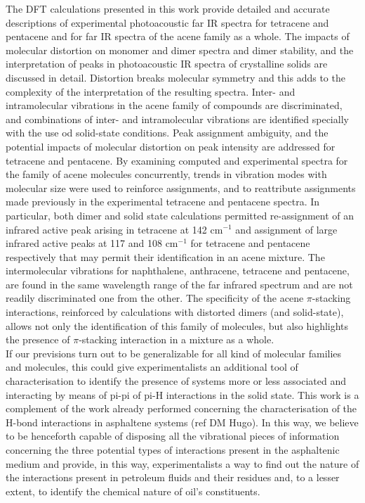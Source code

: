  The DFT calculations presented in this work provide detailed and accurate descriptions of experimental photoacoustic far IR spectra for tetracene and pentacene and for far IR spectra of the acene family as a whole.  The impacts of molecular distortion on monomer and dimer spectra and dimer stability, and the interpretation of peaks in photoacoustic IR spectra of crystalline solids are discussed in detail. Distortion breaks molecular symmetry and this adds to the complexity of the interpretation of the resulting spectra. Inter- and intramolecular vibrations in the acene family of compounds are discriminated, and combinations of inter- and intramolecular vibrations are identified specially with the use od solid-state conditions. Peak assignment ambiguity, and the potential impacts of molecular distortion on peak intensity are addressed for tetracene and pentacene. By examining computed and experimental spectra for the family of acene molecules concurrently, trends in vibration modes with molecular size were used to reinforce assignments, and to reattribute assignments made previously in the experimental tetracene and pentacene spectra. In particular, both dimer and solid state calculations permitted re-assignment of an infrared active peak arising in tetracene at 142 cm$^{-1}$ and assignment of large infrared active peaks at 117 and 108 cm$^{-1}$ for tetracene and pentacene respectively that may permit their identification in an acene mixture. The intermolecular vibrations for naphthalene, anthracene, tetracene and pentacene, are found in the same wavelength range of the far infrared spectrum and are not readily discriminated one from the other. The specificity of the acene $\pi$-stacking interactions, reinforced by calculations with distorted dimers (and solid-state), allows not only the identification of this family of molecules, but also highlights the presence of $\pi$-stacking interaction in a mixture as a whole.\\
 
If our previsions turn out to be generalizable for all kind of molecular families and molecules, this could give experimentalists an additional tool of characterisation to identify the presence of systems more or less associated and interacting by means of pi-pi of pi-H interactions in the solid state. This work is a complement of the work already performed concerning the characterisation of the H-bond interactions in asphaltene systems (ref DM Hugo). In this way, we believe to be henceforth capable of disposing all the vibrational pieces of information concerning the three potential types of interactions present in the asphaltenic medium and provide, in this way, experimentalists a way to find out the nature of the interactions present in petroleum fluids and their residues and, to a lesser extent, to identify the chemical nature of oil’s constituents. 
 
